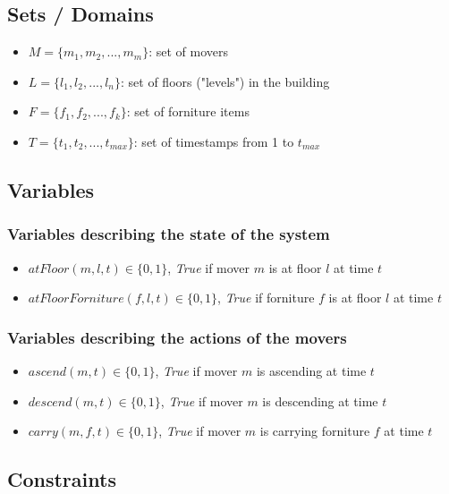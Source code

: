 \documentclass[a4paper, 11pt]{article}
\begin{document}
\subsection{Sets / Domains}

\begin{itemize}
	\item $M = \{m_1, m_2, ..., m_m\}$: set of movers
	\item $L = \{l_1, l_2, ..., l_n\}$: set of floors ("levels") in the building
	\item $F = \{f_1, f_2, ..., f_k\}$: set of forniture items
	\item $T = \{t_1, t_2, ..., t_{max}\}$: set of timestamps from 1 to $t_{max}$
\end{itemize}


\subsection{Variables}

\subsubsection{Variables describing the state of the system}

\begin{itemize}
	\item $atFloor(m, l, t) \in \{0, 1\}$, \textit{True} if mover $m$ is at floor $l$ at time $t$
	\item $atFloorForniture(f, l, t) \in \{0, 1\}$, \textit{True} if forniture $f$ is at floor $l$ at time $t$
\end{itemize}

\subsubsection{Variables describing the actions of the movers}

\begin{itemize}
	\item $ascend(m, t) \in \{0, 1\}$, \textit{True} if mover $m$ is ascending at time $t$
	\item $descend(m, t) \in \{0, 1\}$, \textit{True} if mover $m$ is descending at time $t$
	\item $carry(m, f,  t) \in \{0, 1\}$, \textit{True} if mover $m$ is carrying forniture $f$ at time $t$
\end{itemize}

\subsection{Constraints}
\end{document}
